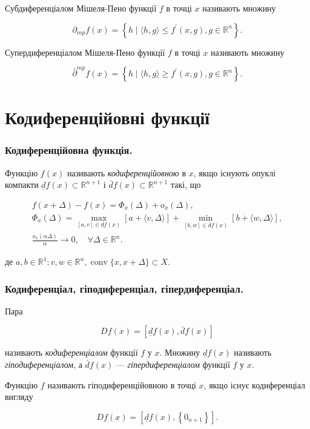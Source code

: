 \documentclass[12pt,a4paper]{extarticle}
\numberwithin{section}{part}
\begin{document}
Субдиференціалом Мішеля-Пено функції $f$ в точці $x$ називають множину

$$
\partial_{m p} f(x)=\left\{h \mid\langle h, g\rangle \leq f^{\prime}(x, g), g \in \mathbb{R}^{n}\right\} .
$$

Супердиференціалом Мішеля-Пено функції $f$ в точці $x$ називають множину

$$
\bar{\partial}^{m p} f(x)=\left\{h \mid\langle h, g\rangle \geq f^{\prime}(x, g), g \in \mathbb{R}^{n}\right\} .
$$

\part{Кодиференційовні функції}

\section{Кодиференційовна функція.}
Функцію $f(x)$ називають \textit{кодиференційовною} в $x$, якщо існують опуклі компакти $\underline{d} f(x) \subset \mathbb{R}^{n+1}$ і $\bar{d} f(x) \subset \mathbb{R}^{n+1}$ такі, що

$$
\begin{gathered}
f(x+\Delta)-f(x)=\Phi_{x}(\Delta)+o_{x}(\Delta), \\
\Phi_{x}(\Delta)=\max _{[a, v] \in \underline{d} f(x)}[a+\langle v, \Delta\rangle]+\min _{[b, w] \in \bar{d} f(x)}[b+\langle w, \Delta\rangle], \\
\frac{o_{x}(\alpha \Delta)}{\alpha} \longrightarrow 0, \quad \forall \Delta \in \mathbb{R}^{n} .
\end{gathered}
$$

де $a, b \in \mathbb{R}^{1} ; v, w \in \mathbb{R}^{n}, \operatorname{conv}\{x, x+\Delta\} \subset X$.

\section{Кодиференціал, гіподиференціал, гіпердиференціал.}
Пара

$$
D f(x)=[\underline{d} f(x), \bar{d} f(x)]
$$

називають \textit{кодиференціалом} функції $f$ у $x$. Множину $\underline{d} f(x)$ називають \textit{гіподиференціалом}, а $\bar{d} f(x)$ --- \textit{гіпердиференціалом} функції $f$ у $x$.

Функцію $f$ називають гіподиференційовною в точці $x$, якщо існує кодиференціал вигляду

$$
D f(x)=\left[\underline{d} f(x),\left\{0_{n+1}\right\}\right] .
$$
\end{document}
